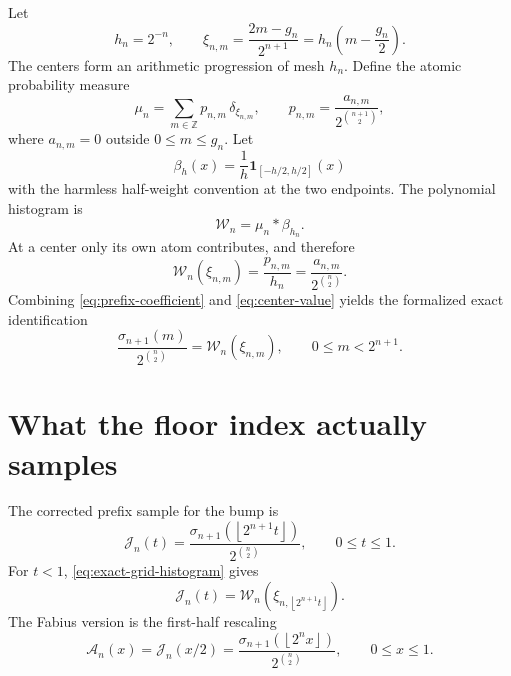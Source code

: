\documentclass[11pt,oneside]{article}
\theoremstyle{definition}
\theoremstyle{remark}
\newcommand{\Z}{\mathbb Z}
\newcommand{\floor}[1]{\left\lfloor #1\right\rfloor}
\newcommand{\indicator}{\mathbf 1}
\begin{document}
Let
\begin{equation}
 h_n=2^{-n},
 \qquad
 \xi_{n,m}=\frac{2m-g_n}{2^{n+1}}
          =h_n\left(m-\frac{g_n}{2}\right).                \label{eq:centers}
\end{equation}
The centers form an arithmetic progression of mesh $h_n$.  Define the atomic
probability measure
\begin{equation}
 \mu_n=\sum_{m\in\Z}p_{n,m}\,\delta_{\xi_{n,m}},
 \qquad
 p_{n,m}=\frac{a_{n,m}}{2^{\binom{n+1}{2}}},               \label{eq:mu-n}
\end{equation}
where $a_{n,m}=0$ outside $0\le m\le g_n$.  Let
\begin{equation}
 \beta_h(x)=\frac1h\indicator_{[-h/2,h/2]}(x)              \label{eq:box-density}
\end{equation}
with the harmless half-weight convention at the two endpoints.  The polynomial
histogram is
\begin{equation}
 \mathcal W_n=\mu_n*\beta_{h_n}.                            \label{eq:histogram-convolution}
\end{equation}
At a center only its own atom contributes, and therefore
\begin{equation}
 \mathcal W_n(\xi_{n,m})
 =\frac{p_{n,m}}{h_n}
 =\frac{a_{n,m}}{2^{\binom n2}}.                           \label{eq:center-value}
\end{equation}
Combining \eqref{eq:prefix-coefficient} and \eqref{eq:center-value} yields the
formalized exact identification
\begin{equation}
 \frac{\sigma_{n+1}(m)}{2^{\binom n2}}
 =\mathcal W_n(\xi_{n,m}),
 \qquad 0\le m<2^{n+1}.                                   \label{eq:exact-grid-histogram}
\end{equation}

\section{What the floor index actually samples}
\label{sec:centering}

The corrected prefix sample for the bump is
\begin{equation}
 \mathcal J_n(t)=
 \frac{\sigma_{n+1}(\floor{2^{n+1}t})}{2^{\binom n2}},
 \qquad 0\le t\le1.                                      \label{eq:J-def}
\end{equation}
For $t<1$, \eqref{eq:exact-grid-histogram} gives
\begin{equation}
 \mathcal J_n(t)=
 \mathcal W_n\!\left(\xi_{n,\floor{2^{n+1}t}}\right).    \label{eq:J-histogram}
\end{equation}
The Fabius version is the first-half rescaling
\begin{equation}
 \mathcal A_n(x)=\mathcal J_n(x/2)
 =\frac{\sigma_{n+1}(\floor{2^n x})}{2^{\binom n2}},
 \qquad 0\le x\le1.                                     \label{eq:A-def}
\end{equation}
\end{document}
